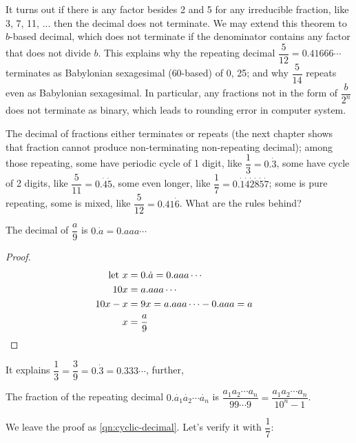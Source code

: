 \documentclass[b5paper]{article}
\begin{document}
It turns out if there is any factor besides 2 and 5 for any irreducible fraction, like 3, 7, 11, ... then the decimal does not terminate. We may extend this theorem to $b$-based decimal, which does not terminate if the denominator contains any factor that does not divide $b$. This explains why the repeating decimal $\dfrac{5}{12} = 0.41666\cdots$ terminates as Babylonian sexagesimal (60-based) of 0, 25; and why $\dfrac{5}{14}$ repeats even as Babylonian sexagesimal. In particular, any fractions not in the form of $\dfrac{b}{2^n}$ does not terminate as binary, which leads to rounding error in computer system.

The decimal of fractions either terminates or repeats (the next chapter shows that fraction cannot produce non-terminating non-repeating decimal); among those repeating, some have periodic cycle of 1 digit, like $\dfrac{1}{3} = 0.\dot{3}$, some have cycle of 2 digits, like $\dfrac{5}{11} = 0.\dot{4}\dot{5}$, some even longer, like $\dfrac{1}{7} = 0.\dot{1}\dot{4}\dot{2}\dot{8}\dot{5}\dot{7}$; some is pure repeating, some is mixed, like $\dfrac{5}{12} = 0.41\dot{6}$. What are the rules behind?

\begin{proposition}
The decimal of $\dfrac{a}{9}$ is $0.\dot{a} = 0.aaa\cdots$
\end{proposition}

\begin{proof}
  \begin{align*}
    \text{let }x &= 0.\dot{a} = 0.aaa\cdots && \\
           10x &= a.aaa\cdots && \\
       10x - x &= 9x = a.aaa\cdots - 0.aaa = a && \\
             x &= \frac{a}{9} && \qedhere
  \end{align*}
\end{proof}

It explains $\dfrac{1}{3} = \dfrac{3}{9} = 0.\dot{3} = 0.333\cdots$, further,

\begin{proposition} \label{th:cyclic-decimal}
The fraction of the repeating decimal $0.\dot{a_1} \dot{a_2} \cdots \dot{a_n}$ is $\dfrac{a_1 a_2 \cdots a_n}{99 \cdots 9} = \dfrac{a_1 a_2 \cdots a_n}{10^{n} - 1}$.
\end{proposition}

We leave the proof as \cref{qn:cyclic-decimal}. Let's verify it with $\dfrac{1}{7}$:

\begin{center}
\end{center}
\end{document}
